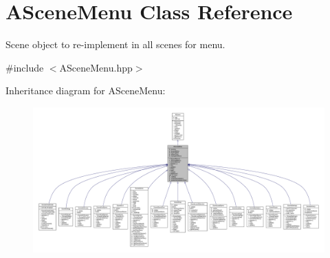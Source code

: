 \hypertarget{class_a_scene_menu}{}\section{A\+Scene\+Menu Class Reference}
\label{class_a_scene_menu}


Scene object to re-\/implement in all scenes for menu.  




{\ttfamily \#include $<$A\+Scene\+Menu.\+hpp$>$}



Inheritance diagram for A\+Scene\+Menu\+:
\nopagebreak
\begin{figure}[H]
\begin{center}
\leavevmode
\includegraphics[width=350pt]{class_a_scene_menu__inherit__graph}
\end{center}
\end{figure}



